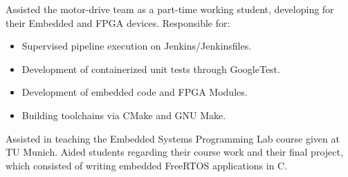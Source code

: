 \documentclass[10pt,a4paper,ragged2e,withhyper]{altacv}
\begin{document}
\begin{paracol}{2}
\divider

Assisted the motor-drive team as a part-time working student, developing for their Embedded and FPGA devices.
Responsible for:
\begin{itemize}
\item Supervised pipeline execution on Jenkins/Jenkinsfiles.
\item Development of containerized unit tests through GoogleTest.
\item Development of embedded code and FPGA Modules.
\item Building toolchains via CMake and GNU Make.
\end{itemize}

\divider

Assisted in teaching the Embedded Systems Programming Lab course given at TU Munich.
Aided students regarding their course work and their final project, which 
consisted of writing embedded FreeRTOS applications in C.

\medskip

\nocite{*}

\switchcolumn


 \\
\\
\\
\\
\\
\\
\\
\\


\\



\end{paracol}
\end{document}
